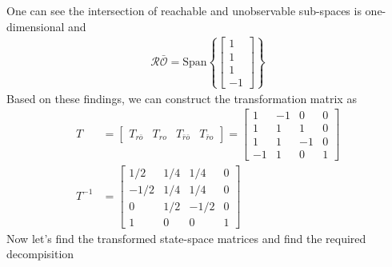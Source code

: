 \documentclass[twoside]{article}
\begin{document}
%
One can see the intersection of reachable and unobservable sub-spaces 
is one-dimensional and 
%
\begin{align*}
    \mathcal{R}\bar{\mathcal{O}} = \mathrm{Span} \left\lbrace 
    \left[ \begin{array}{c} 1 \\  1 \\  1 \\  -1  \end{array} \right] \right\rbrace 
\end{align*}
%
Based on these findings, we can construct the transformation matrix as
%
\begin{align*}
   T &= \left[ \begin{array}{c|c|c|c} T_{r\bar{o}} & T_{ro} & T_{\bar{r} \bar{o}} & T_{\bar{r} o} \end{array} \right] 
   = \left[ \begin{array}{c|c|c|c} 1 & -1 & 0 & 0
   \\
   1 & 1 & 1 & 0
   \\
   1 & 1 & -1 & 0
   \\
   -1 & 1 & 0 & 1
   \end{array} \right] 
   \\
   T^{-1} &= \left[ \begin{array}{c|c|c|c} 1/2 & 1/4 & 1/4 & 0
   \\
   -1/2 & 1/4 & 1/4 & 0
   \\
   0 & 1/2 & -1/2 & 0
   \\
   1 & 0 & 0 & 1
   \end{array} \right] 
\end{align*}
%
Now let's find the transformed state-space matrices 
and find the required decompisition
\end{document}
